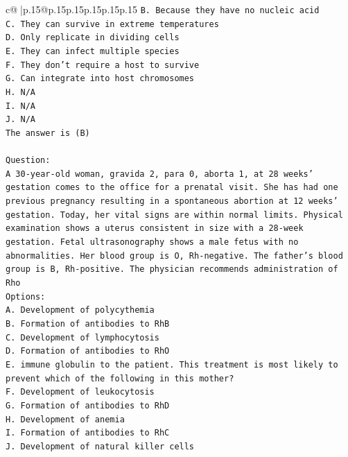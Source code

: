 \documentclass{article}
\begin{document}
{\begin{supertabular}{c@{$\;$}|p{.15\linewidth}@{}p{.15\linewidth}p{.15\linewidth}p{.15\linewidth}p{.15\linewidth}p{.15\linewidth}}
{{{\texttt{B. Because they have no nucleic acid} \\
\texttt{C. They can survive in extreme temperatures} \\
\texttt{D. Only replicate in dividing cells} \\
\texttt{E. They can infect multiple species} \\
\texttt{F. They don't require a host to survive} \\
\texttt{G. Can integrate into host chromosomes} \\
\texttt{H. N/A} \\
\texttt{I. N/A} \\
\texttt{J. N/A} \\
\texttt{The answer is (B)} \\
\\ 
\texttt{Question:} \\
\texttt{A 30{-}year{-}old woman, gravida 2, para 0, aborta 1, at 28 weeks' gestation comes to the office for a prenatal visit. She has had one previous pregnancy resulting in a spontaneous abortion at 12 weeks' gestation. Today, her vital signs are within normal limits. Physical examination shows a uterus consistent in size with a 28{-}week gestation. Fetal ultrasonography shows a male fetus with no abnormalities. Her blood group is O, Rh{-}negative. The father's blood group is B, Rh{-}positive. The physician recommends administration of Rho} \\
\texttt{Options:} \\
\texttt{A. Development of polycythemia} \\
\texttt{B. Formation of antibodies to RhB} \\
\texttt{C. Development of lymphocytosis} \\
\texttt{D. Formation of antibodies to RhO} \\
\texttt{E. immune globulin to the patient. This treatment is most likely to prevent which of the following in this mother?} \\
\texttt{F. Development of leukocytosis} \\
\texttt{G. Formation of antibodies to RhD} \\
\texttt{H. Development of anemia} \\
\texttt{I. Formation of antibodies to RhC} \\
\texttt{J. Development of natural killer cells} \\
            }
        }
    }
     \\ \\


\end{supertabular}}
\end{document}
